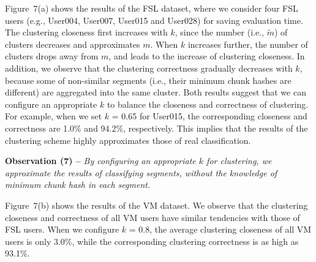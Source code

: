 Figure~7(a) shows the results of the FSL dataset, where we consider four FSL users (e.g., User004, User007, User015 and User028) for saving evaluation time. The clustering closeness first increases with $k$, since the number (i.e., $\widetilde{m}$) of clusters decreases and approximates $m$. When $k$ increases further, the number of clusters drops away from $m$, and leads to the increase of clustering closeness.  In addition, we observe that the clustering correctness gradually decreases with $k$, because some of non-similar segments (i.e., their minimum chunk hashes are different) are aggregated into the same cluster. Both results suggest that we can configure an appropriate $k$ to balance the closeness and correctness of clustering. For example, when we set $k$ = 0.65 for User015, the corresponding closeness and correctness are 1.0\% and 94.2\%, respectively. This implies that the results of the clustering scheme  highly approximates those of real classification.             

{\bf Observation (7) --} {\em By configuring an appropriate $k$ for clustering, we  approximate the results of  classifying segments, without the knowledge of  minimum chunk hash in each segment.}   

Figure~7(b) shows the results of the VM dataset. We observe that the clustering closeness and correctness of all VM users have  similar tendencies with those of FSL users. When we configure $k$ = 0.8, the average clustering closeness of all VM users is only 3.0\%, while the corresponding clustering correctness is as high as 93.1\%.     


